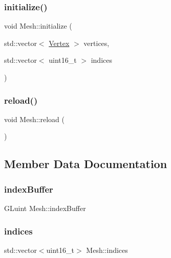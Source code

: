 \mbox{\label{class_mesh_a57c92bc4696d2021fd27d2d97160e4d0}} 
\subsubsection{\texorpdfstring{initialize()}{initialize()}}
{\footnotesize\ttfamily void Mesh\+::initialize (\begin{DoxyParamCaption}\item[{std\+::vector$<$ \hyperlink{struct_vertex}{Vertex} $>$}]{vertices,  }\item[{std\+::vector$<$ uint16\+\_\+t $>$}]{indices }\end{DoxyParamCaption})}

\mbox{\label{class_mesh_ad331a787fe94be45d100c8cf4ca43a57}} 
\subsubsection{\texorpdfstring{reload()}{reload()}}
{\footnotesize\ttfamily void Mesh\+::reload (\begin{DoxyParamCaption}{ }\end{DoxyParamCaption})}



\subsection{Member Data Documentation}
\mbox{\label{class_mesh_abe7587c429d8ed1662de8796ebdaf09d}} 
\subsubsection{\texorpdfstring{index\+Buffer}{indexBuffer}}
{\footnotesize\ttfamily G\+Luint Mesh\+::index\+Buffer\hspace{0.3cm}{\ttfamily [private]}}

\mbox{\label{class_mesh_a36a2f9ff21b740b317dadd2f890489c5}} 
\subsubsection{\texorpdfstring{indices}{indices}}
{\footnotesize\ttfamily std\+::vector$<$uint16\+\_\+t$>$ Mesh\+::indices\hspace{0.3cm}{\ttfamily [private]}}

